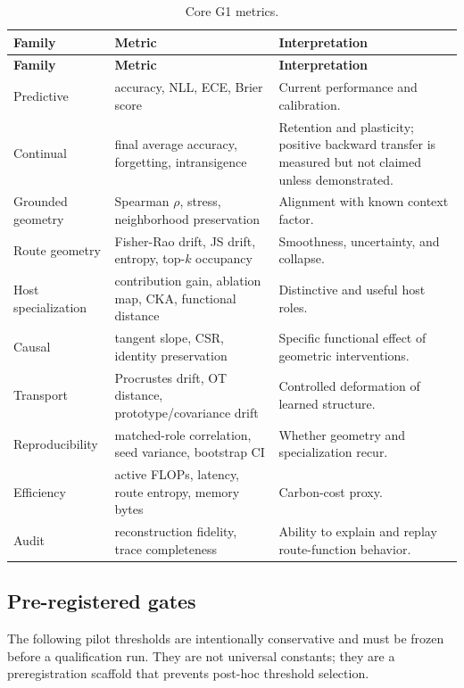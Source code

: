 \documentclass[11pt,a4paper]{article}
\begin{document}
\begin{longtable}{@{}p{3.3cm}p{5.2cm}p{6.3cm}@{}}
\caption{Core G1 metrics.}\label{tab:metrics}\\
\toprule
\textbf{Family} & \textbf{Metric} & \textbf{Interpretation} \\
\midrule
\endfirsthead
\toprule
\textbf{Family} & \textbf{Metric} & \textbf{Interpretation} \\
\midrule
\endhead
Predictive & accuracy, NLL, ECE, Brier score & Current performance and calibration. \\
Continual & final average accuracy, forgetting, intransigence & Retention and plasticity; positive backward transfer is measured but not claimed unless demonstrated. \\
Grounded geometry & Spearman \(\rho\), stress, neighborhood preservation & Alignment with known context factor. \\
Route geometry & Fisher-Rao drift, JS drift, entropy, top-\(k\) occupancy & Smoothness, uncertainty, and collapse. \\
Host specialization & contribution gain, ablation map, CKA, functional distance & Distinctive and useful host roles. \\
Causal & tangent slope, CSR, identity preservation & Specific functional effect of geometric interventions. \\
Transport & Procrustes drift, OT distance, prototype/covariance drift & Controlled deformation of learned structure. \\
Reproducibility & matched-role correlation, seed variance, bootstrap CI & Whether geometry and specialization recur. \\
Efficiency & active FLOPs, latency, route entropy, memory bytes & Carbon-cost proxy. \\
Audit & reconstruction fidelity, trace completeness & Ability to explain and replay route-function behavior. \\
\bottomrule
\end{longtable}

\subsection{Pre-registered gates}

The following pilot thresholds are intentionally conservative and must be frozen before a qualification run. They are not universal constants; they are a preregistration scaffold that prevents post-hoc threshold selection.
\end{document}
